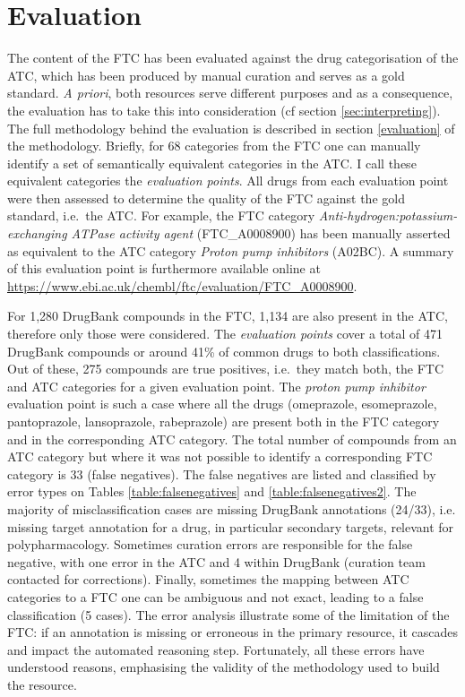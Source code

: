 \section{Evaluation}
The content of the FTC has been evaluated against the drug categorisation of the ATC, which has been produced by manual curation and serves as a gold standard. \emph{A priori}, both resources serve different purposes and as a consequence, the evaluation has to take this into consideration (cf section \ref{sec:interpreting}). The full methodology behind the evaluation is described in section \ref{evaluation} of the methodology. Briefly, for 68 categories from the FTC one can manually identify a set of semantically equivalent categories in the ATC. I call these equivalent categories the \emph{evaluation points}. All drugs from each evaluation point were then assessed to determine the quality of the FTC against the gold standard, i.e.\ the ATC. For example, the FTC category \emph{Anti-hydrogen:potassium-exchanging ATPase activity agent} (FTC\_A0008900) has been manually asserted as equivalent to the ATC category \emph{Proton pump inhibitors} (A02BC). A summary of this evaluation point is furthermore available online at \url{https://www.ebi.ac.uk/chembl/ftc/evaluation/FTC\_A0008900}.

For 1,280 DrugBank compounds in the FTC, 1,134 are also present in the ATC, therefore only those were considered. The \emph{evaluation points} cover a total of 471 DrugBank compounds or around 41\% of common drugs to both classifications. Out of these, 275 compounds are true positives, i.e.\ they match both, the FTC and ATC categories for a given evaluation point. The \emph{proton pump inhibitor} evaluation point is such a case where all the drugs (omeprazole, esomeprazole, pantoprazole, lansoprazole, rabeprazole) are present both in the FTC category and in the corresponding ATC category. The total number of compounds from an ATC category but where it was not possible to identify a corresponding FTC category is 33 (false negatives). The false negatives are listed and classified by error types on Tables \ref{table:falsenegatives} and \ref{table:falsenegatives2}. The majority of misclassification cases are missing DrugBank annotations (24/33), i.e. missing target annotation for a drug, in particular secondary targets, relevant for polypharmacology. Sometimes curation errors are responsible for the false negative, with one error in the ATC and 4 within DrugBank (curation team contacted for corrections). Finally, sometimes the mapping between ATC categories to a FTC one can be ambiguous and not exact, leading to a false classification (5 cases). The error analysis illustrate some of the limitation of the FTC: if an annotation is missing or erroneous in the primary resource, it cascades and impact the automated reasoning step. Fortunately, all these errors have understood reasons, emphasising the validity of the methodology used to build the resource.

